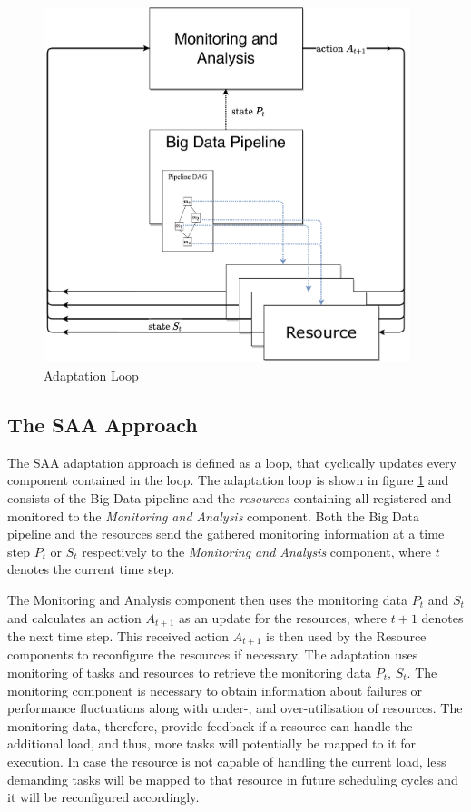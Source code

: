     \begin{figure}[h!]
        \centering
        \includegraphics[width=0.95\textwidth]{figures/monitoring_with_inner_resources.drawio.pdf}
        \caption{Adaptation Loop}
        \label{fig:adaptation-loop}
    \end{figure}

    \subsection{The SAA Approach}

      The SAA adaptation approach is defined as a loop, that cyclically updates every component contained in the loop.
      The adaptation loop is shown in figure \ref{fig:adaptation-loop} and consists of the Big Data pipeline and the \emph{resources} containing all registered and monitored to the \emph{Monitoring and Analysis} component. 
      Both the Big Data pipeline and the resources send the gathered monitoring information at a time step $P_t$ or $S_t$ respectively to the \emph{Monitoring and Analysis} component, where $t$ denotes the current time step.

      The Monitoring and Analysis component then uses the monitoring data $P_t$ and $S_t$ and calculates an action $A_{t+1}$ as an update for the resources, where $t+1$ denotes the next time step.
      This received action $A_{t+1}$ is then used by the Resource components to reconfigure the resources if necessary.
      The adaptation uses monitoring of tasks and resources to retrieve the monitoring data $P_t$, $S_t$.
      The monitoring component is necessary to obtain information about failures or performance fluctuations along with under-, and over-utilisation of resources.
      The monitoring data, therefore, provide feedback if a resource can handle the additional load, and thus, more tasks will potentially be mapped to it for execution. 
      In case the resource is not capable of handling the current load, less demanding tasks will be mapped to that resource in future scheduling cycles and it will be reconfigured accordingly.


